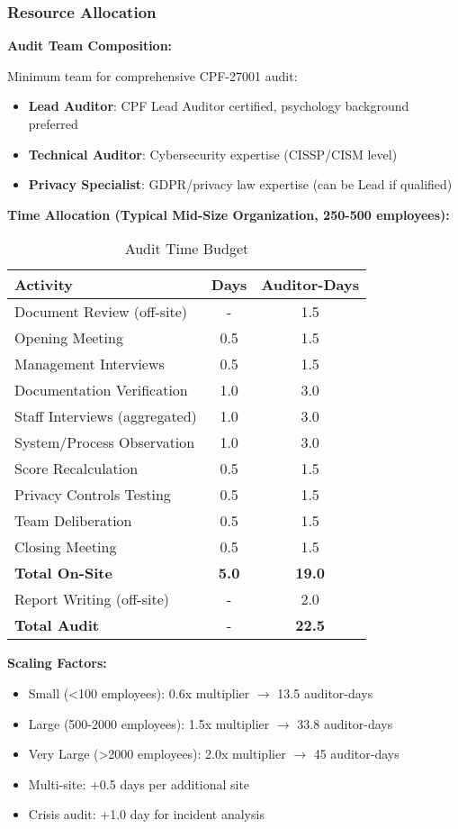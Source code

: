 \documentclass[11pt,a4paper]{article}
\begin{document}
\subsubsection{Resource Allocation}

\textbf{Audit Team Composition:}

Minimum team for comprehensive CPF-27001 audit:
\begin{itemize}
\item \textbf{Lead Auditor}: CPF Lead Auditor certified, psychology background preferred
\item \textbf{Technical Auditor}: Cybersecurity expertise (CISSP/CISM level)
\item \textbf{Privacy Specialist}: GDPR/privacy law expertise (can be Lead if qualified)
\end{itemize}

\textbf{Time Allocation (Typical Mid-Size Organization, 250-500 employees):}

\begin{table}[h]
\centering
\caption{Audit Time Budget}
\begin{tabular}{lcc}
\toprule
\textbf{Activity} & \textbf{Days} & \textbf{Auditor-Days} \\
\midrule
Document Review (off-site) & - & 1.5 \\
Opening Meeting & 0.5 & 1.5 \\
Management Interviews & 0.5 & 1.5 \\
Documentation Verification & 1.0 & 3.0 \\
Staff Interviews (aggregated) & 1.0 & 3.0 \\
System/Process Observation & 1.0 & 3.0 \\
Score Recalculation & 0.5 & 1.5 \\
Privacy Controls Testing & 0.5 & 1.5 \\
Team Deliberation & 0.5 & 1.5 \\
Closing Meeting & 0.5 & 1.5 \\
\midrule
\textbf{Total On-Site} & \textbf{5.0} & \textbf{19.0} \\
Report Writing (off-site) & - & 2.0 \\
\midrule
\textbf{Total Audit} & - & \textbf{22.5} \\
\bottomrule
\end{tabular}
\end{table}

\textbf{Scaling Factors:}
\begin{itemize}
\item Small (<100 employees): 0.6x multiplier $\rightarrow$ 13.5 auditor-days
\item Large (500-2000 employees): 1.5x multiplier $\rightarrow$ 33.8 auditor-days
\item Very Large (>2000 employees): 2.0x multiplier $\rightarrow$ 45 auditor-days
\item Multi-site: +0.5 days per additional site
\item Crisis audit: +1.0 day for incident analysis
\end{itemize}
\end{document}
